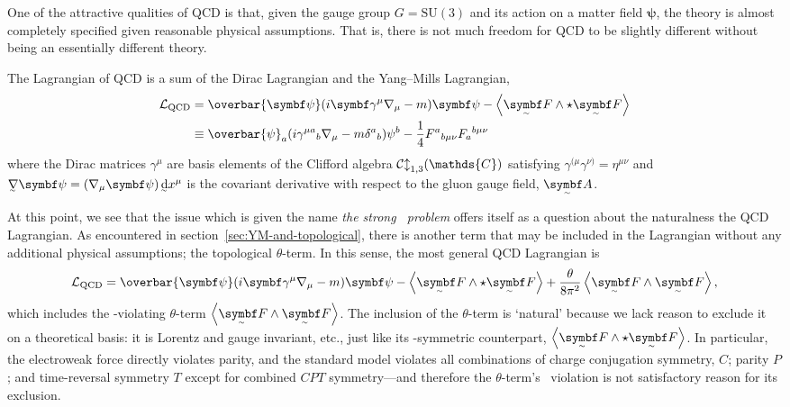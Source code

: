 One of the attractive qualities of QCD is that, given the gauge group $G = \mathrm{SU}(3)$ and its action on a matter field $\bm\psi$, the theory is almost completely specified given reasonable physical assumptions.
That is, there is not much freedom for QCD to be slightly different without being an essentially different theory.

The Lagrangian of QCD is a sum of the Dirac Lagrangian and the Yang--Mills Lagrangian,
\begin{align}
	\cal L_\text{QCD} &= \overbar{\bm\psi}\qty(i\bm\gamma^\mu\nabla_\mu - m)\bm\psi - \ang{\tsbm F \wedge\star \tsbm F}
\\	&\equiv \overbar{\psi}_a\qty(i\gamma^{\mu a}{}_b\nabla_\mu - m\delta^a{}_b)\psi^b - \frac14F^a{}_{b\mu\nu}F_a{}^{b\mu\nu}
\end{align}
where the Dirac matrices $\gamma^\mu$ are basis elements of the Clifford algebra $\cal{Cl}_{1,3}(\mathds{C})$ satisfying
$\gamma^{(\mu}\gamma^{\nu)} = \eta^{\mu\nu}$ and $\ts\nabla\bm\psi = (\nabla_\mu\bm\psi) \, \ts\dd x^\mu$ is the covariant derivative with respect to the gluon gauge field, $\tsbm A$.


At this point, we see that the issue which is given the name \emph{the strong \CP\ problem} offers itself as a question about the naturalness the QCD Lagrangian.
As encountered in section~\ref{sec:YM-and-topological}, there is another term that may be included in the Lagrangian without any additional physical assumptions; the topological $\theta$-term.
In this sense, the most general QCD Lagrangian is
\begin{align}
	\cal L_\text{QCD} = \overbar{\bm\psi}\qty(i\bm\gamma^\mu\nabla_\mu - m)\bm\psi
	- \ang{\tsbm F \wedge\star \tsbm F}
	+ \frac{\theta}{8\pi^2}\ang{\tsbm F \wedge \tsbm F}
,\end{align}
which includes the \CP-violating $\theta$-term $\ang{\tsbm F\wedge\tsbm F}$.
The inclusion of the $\theta$-term is `natural' because we lack reason to exclude it on a theoretical basis: it is Lorentz and gauge invariant, etc., just like its \CP-symmetric counterpart, $\ang{\tsbm F \wedge\star\tsbm F}$.
In particular, the electroweak force directly violates parity, and the standard model violates all combinations of charge conjugation symmetry, $C$; parity $P$; and time-reversal symmetry $T$ except for combined $CPT$ symmetry---and therefore the $\theta$-term's \CP\ violation is not satisfactory reason for its exclusion.

